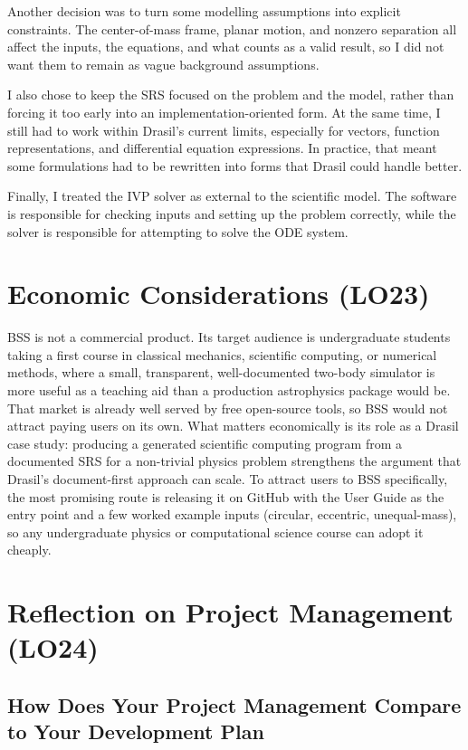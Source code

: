 \documentclass{article}
\begin{document}
Another decision was to turn some modelling assumptions into explicit
constraints. The center-of-mass frame, planar motion, and nonzero
separation all affect the inputs, the equations, and what counts as a
valid result, so I did not want them to remain as vague background
assumptions.

I also chose to keep the SRS focused on the problem and the model,
rather than forcing it too early into an implementation-oriented form.
At the same time, I still had to work within Drasil's current limits,
especially for vectors, function representations, and differential
equation expressions. In practice, that meant some formulations had to
be rewritten into forms that Drasil could handle better.

Finally, I treated the IVP solver as external to the scientific model.
The software is responsible for checking inputs and setting up the
problem correctly, while the solver is responsible for attempting to
solve the ODE system.

\section{Economic Considerations (LO23)}

BSS is not a commercial product. Its target audience is undergraduate
students taking a first course in classical mechanics, scientific
computing, or numerical methods, where a small, transparent, well-documented
two-body simulator is more useful as a teaching aid than a production
astrophysics package would be. That market is already well served by
free open-source tools, so BSS would not attract paying users on its
own. What matters economically is its role as a Drasil case study:
producing a generated scientific computing program from a documented
SRS for a non-trivial physics problem strengthens the argument that
Drasil's document-first approach can scale. To attract users to BSS
specifically, the most promising route is releasing it on GitHub with
the User Guide as the entry point and a few worked example inputs
(circular, eccentric, unequal-mass), so any undergraduate physics or
computational science course can adopt it cheaply.

\section{Reflection on Project Management (LO24)}

\subsection{How Does Your Project Management Compare to Your Development Plan}
\end{document}
